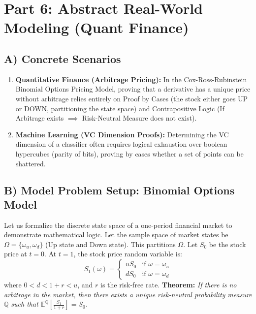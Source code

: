 \documentclass[11pt, letterpaper]{article}
\theoremstyle{definition}
\theoremstyle{remark}
\newcommand{\E}{\mathbb{E}}
\begin{document}
\newpage

\section{Part 6: Abstract Real-World Modeling (Quant Finance)}

\subsection{A) Concrete Scenarios}
\begin{enumerate}
    \item \textbf{Quantitative Finance (Arbitrage Pricing):} In the Cox-Ross-Rubinstein Binomial Options Pricing Model, proving that a derivative has a unique price without arbitrage relies entirely on Proof by Cases (the stock either goes UP or DOWN, partitioning the state space) and Contrapositive Logic (If Arbitrage exists $\implies$ Risk-Neutral Measure does not exist).
    \item \textbf{Machine Learning (VC Dimension Proofs):} Determining the VC dimension of a classifier often requires logical exhaustion over boolean hypercubes (parity of bits), proving by cases whether a set of points can be shattered.
\end{enumerate}

\subsection{B) Model Problem Setup: Binomial Options Model}
Let us formalize the discrete state space of a one-period financial market to demonstrate mathematical logic. Let the sample space of market states be $\Omega = \{\omega_u, \omega_d\}$ (Up state and Down state). This partitions $\Omega$.
Let $S_0$ be the stock price at $t=0$. At $t=1$, the stock price random variable is:
\[
S_1(\omega) = 
\begin{cases} 
u S_0 & \text{if } \omega = \omega_u \\
d S_0 & \text{if } \omega = \omega_d 
\end{cases}
\]
where $0 < d < 1+r < u$, and $r$ is the risk-free rate.
\textbf{Theorem:} \textit{If there is no arbitrage in the market, then there exists a unique risk-neutral probability measure $\mathbb{Q}$ such that $\E^{\mathbb{Q}}\left[\frac{S_1}{1+r}\right] = S_0$.}
\end{document}
